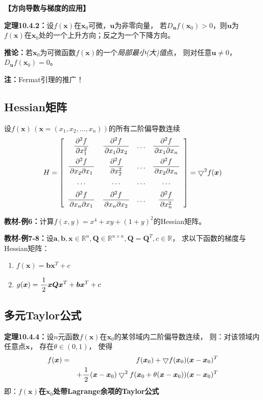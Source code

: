 {\bf 【方向导数与梯度的应用】}

{\bf 定理10.4.2：}设$f(\bm{x})$在$\bm{x}_0$可微，$\bm{u}$为非零向量，
若$D_{\bm{u}}f(\bm{x}_0)>0$，则$\bm{u}$为
$f(\bm{x})$在$\bm{x}_0$处的一个上升方向；反之为一个下降方向。

{\bf 推论：}若$\bm{x}_0$为可微函数$f(\bm{x})$的一个{\it 局部最小(大)值}点，
则对任意$\bm{u}\ne 0$，$D_{\bm{u}}f(\bm{x}_0)=0$。

{\bf 注：}Fermat引理的推广！

\subsection{Hessian矩阵}

设$f(\bm{x})\,(\bm{x}=(x_1,x_2,\ldots,x_n))$的所有二阶偏导数连续 
$$H=\left[\begin{array}{cccc}
	\displaystyle\frac{\,{\partial^2 f}\,}{\,{\partial x_1^2}\,} & \displaystyle\frac{\,{\partial^2 f}\,}{\,{\partial x_1\partial x_2}\,} & \ldots & \displaystyle\frac{\,{\partial^2
	f}\,}{\,{\partial x_1\partial x_n}\,}\\[10pt]
	\displaystyle\frac{\,{\partial^2 f}\,}{\,{\partial x_2\partial x_1}\,} & \displaystyle\frac{\,{\partial^2 f}\,}{\,{\partial x_2^2}\,} & \ldots & \displaystyle\frac{\,{\partial^2
	f}\,}{\,{\partial x_2\partial x_n}\,}\\[10pt]
	\ldots & \ldots & \ldots & \ldots\\[6pt]
	\displaystyle\frac{\,{\partial^2 f}\,}{\,{\partial x_n\partial x_1}\,} & \displaystyle\frac{\,{\partial^2 f}\,}{\,{\partial x_n\partial x_2}\,} & \ldots & \displaystyle\frac{\,{\partial^2
	f}\,}{\,{\partial x_n^2}\,}
	\end{array}\right]
=\bigtriangledown^2 f(\bm{x})$$

{\bf 教材-例6：}计算$f(x,y)=x^4+xy+(1+y)^2$的Hessian矩阵。

{\bf 教材-例7-8：}设$\bm{a},\bm{b},\bm{x}\in\mathbb{R}^n,\bm{Q}
\in\mathbb{R}^{n\times n},\bm{Q}=\bm{Q}^T,c\in\mathbb{R}$，
求以下函数的梯度与Hessian矩阵：
\begin{enumerate}[(1)]
  \setlength{\itemindent}{1cm}
  \item $f(\bm{x})=\bm{b}\bm{x}^{T}+c$
  \item $g(\bm{x})=\displaystyle\frac{\,{1}\,}{\,{2}\,}\bm{x}\bm{Q}\bm{x}^T+\bm{b}\bm{x}^{T}+c$
\end{enumerate}

\subsection{多元Taylor公式}

{\bf 定理10.4.4：}设$n$元函数$f(\bm{x})$在$\bm{x}_0$的某邻域内二阶偏导数连续， 
则：对该领域内任意点$\bm{x}$， 存在$\theta\in(0,1)$， 使得
\begin{eqnarray*}
	f(\bm{x}) & = & f(\bm{x}_0)+\bigtriangledown f(\bm{x}_0)(\bm{x}-\bm{x}_0)^T\\
	& & + \displaystyle\frac{\,{1}\,}{\,{2}\,}(\bm{x}-\bm{x}_0)\bigtriangledown^2
	f(\bm{x}_0+\theta(\bm{x}-\bm{x}_0))(\bm{x}-\bm{x}_0)^T
\end{eqnarray*} 
即：{\bf $f(\bm{x})$在$\bm{x}_0$处带Lagrange余项的Taylor公式}

